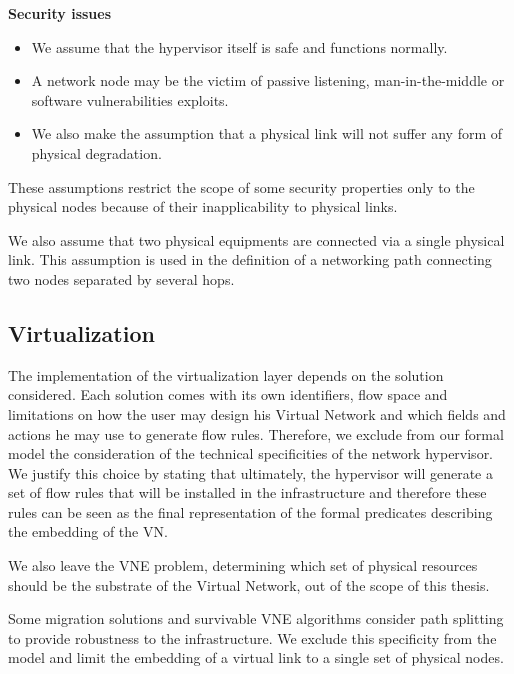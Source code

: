 \textbf{Security issues} 
\begin{itemize}
    \item We assume that the hypervisor itself is safe and functions normally.
    \item A network node may be the victim of passive listening, man-in-the-middle or software vulnerabilities exploits.
    \item We also make the assumption that a physical link will not suffer any form of physical degradation.
\end{itemize}

These assumptions  restrict the scope of some security properties only to the physical nodes because of their inapplicability to physical links.

We also assume that two physical equipments are connected via a single physical link. This assumption is used in the definition of a networking path connecting two nodes separated by several hops.

\subsection{Virtualization}
The implementation of the virtualization layer depends on the solution considered.
Each solution comes with its own identifiers, flow space and limitations on how the user may design his Virtual Network and which fields and actions he may use to generate flow rules. Therefore, we exclude from our formal model the consideration of the technical specificities of the network hypervisor.
We justify this choice by stating that ultimately, the hypervisor will generate a set of flow rules that will be installed in the infrastructure and therefore these rules can be seen as the final representation of the formal predicates describing the embedding of the VN.

We also leave the VNE problem, \ie determining which set of physical resources should be the substrate of the Virtual Network, out of the scope of this thesis.

Some migration solutions and survivable VNE algorithms consider path splitting to provide robustness to the infrastructure.
We exclude this specificity from the model and limit the embedding of a virtual link to a single set of physical nodes.
